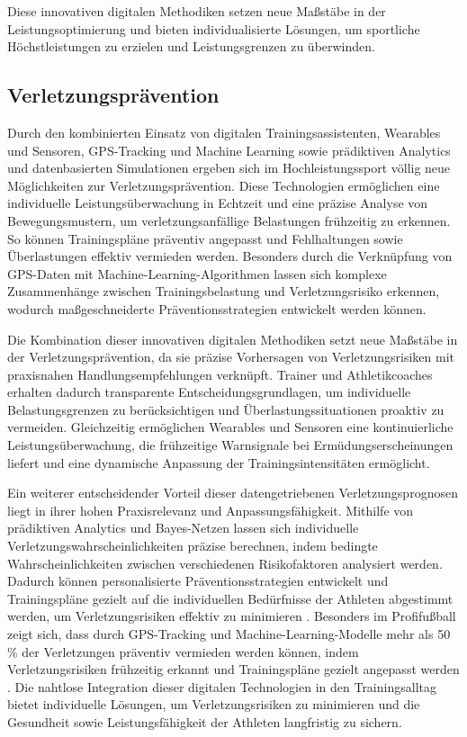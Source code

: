 \documentclass[
  number]{elsarticle}
\begin{document}
Diese innovativen digitalen Methodiken setzen neue Maßstäbe in der
Leistungsoptimierung und bieten individualisierte Lösungen, um
sportliche Höchstleistungen zu erzielen und Leistungsgrenzen zu
überwinden.

\subsection{Verletzungsprävention}\label{verletzungspruxe4vention}

Durch den kombinierten Einsatz von digitalen Trainingsassistenten,
Wearables und Sensoren, GPS-Tracking und Machine Learning sowie
prädiktiven Analytics und datenbasierten Simulationen ergeben sich im
Hochleistungssport völlig neue Möglichkeiten zur Verletzungsprävention.
Diese Technologien ermöglichen eine individuelle Leistungsüberwachung in
Echtzeit und eine präzise Analyse von Bewegungsmustern, um
verletzungsanfällige Belastungen frühzeitig zu erkennen. So können
Trainingspläne präventiv angepasst und Fehlhaltungen sowie Überlastungen
effektiv vermieden werden. Besonders durch die Verknüpfung von GPS-Daten
mit Machine-Learning-Algorithmen lassen sich komplexe Zusammenhänge
zwischen Trainingsbelastung und Verletzungsrisiko erkennen, wodurch
maßgeschneiderte Präventionsstrategien entwickelt werden können.
\citetext{\citealp[pp.~144-145]{memmert_sporttechnologie}; \citealp{rossi_injuryforecasting}}

Die Kombination dieser innovativen digitalen Methodiken setzt neue
Maßstäbe in der Verletzungsprävention, da sie präzise Vorhersagen von
Verletzungsrisiken mit praxisnahen Handlungsempfehlungen verknüpft.
Trainer und Athletikcoaches erhalten dadurch transparente
Entscheidungsgrundlagen, um individuelle Belastungsgrenzen zu
berücksichtigen und Überlastungssituationen proaktiv zu vermeiden.
Gleichzeitig ermöglichen Wearables und Sensoren eine kontinuierliche
Leistungsüberwachung, die frühzeitige Warnsignale bei
Ermüdungserscheinungen liefert und eine dynamische Anpassung der
Trainingsintensitäten ermöglicht.
\citetext{\citealp[p.~439]{wearables_Käferböck}; \citealp[pp.~152-
157]{memmert_sporttechnologie}}

Ein weiterer entscheidender Vorteil dieser datengetriebenen
Verletzungsprognosen liegt in ihrer hohen Praxisrelevanz und
Anpassungsfähigkeit. Mithilfe von prädiktiven Analytics und Bayes-Netzen
lassen sich individuelle Verletzungswahrscheinlichkeiten präzise
berechnen, indem bedingte Wahrscheinlichkeiten zwischen verschiedenen
Risikofaktoren analysiert werden. Dadurch können personalisierte
Präventionsstrategien entwickelt und Trainingspläne gezielt auf die
individuellen Bedürfnisse der Athleten abgestimmt werden, um
Verletzungsrisiken effektiv zu minimieren
\citep[pp.~22-24]{sportanalytics}. Besonders im Profifußball zeigt sich,
dass durch GPS-Tracking und Machine-Learning-Modelle mehr als 50 \% der
Verletzungen präventiv vermieden werden können, indem Verletzungsrisiken
frühzeitig erkannt und Trainingspläne gezielt angepasst werden
\citep{rossi_injuryforecasting}. Die nahtlose Integration dieser
digitalen Technologien in den Trainingsalltag bietet individuelle
Lösungen, um Verletzungsrisiken zu minimieren und die Gesundheit sowie
Leistungsfähigkeit der Athleten langfristig zu sichern.
\end{document}
